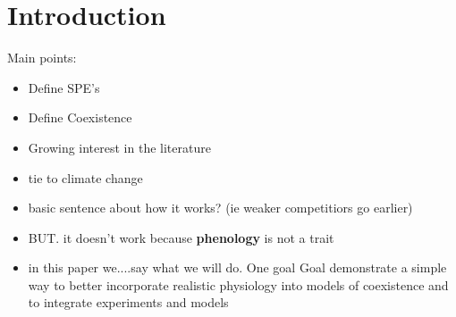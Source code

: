 \documentclass{article}[12pt]
\begin{document}


\section{Introduction}
Main points:
\begin{itemize}
\item Define SPE's
\item Define Coexistence
\item Growing interest in the literature
\item tie to climate change
\item basic sentence about how it works? (ie weaker competitiors go earlier)
\item BUT. it doesn't work because \textbf{phenology} is not a trait
\item in this paper we....say what we will do. One goal Goal demonstrate a simple way to better incorporate realistic physiology into models of coexistence and to integrate experiments and models

\end{itemize}
\end{document}
